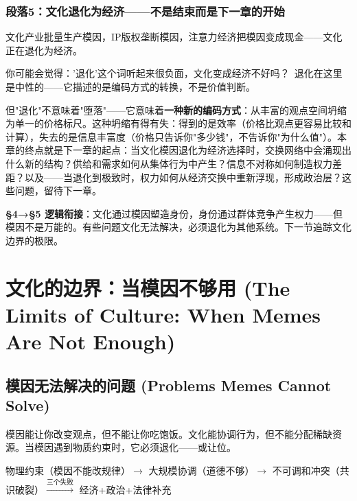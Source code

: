 \documentclass[../main.tex]{subfiles}
\begin{document}
	\subsubsection*{段落5：文化退化为经济——不是结束而是下一章的开始}

	文化产业批量生产模因，IP版权垄断模因，注意力经济把模因变成现金——文化正在退化为经济。

	\begin{tcolorbox}[colback=yellow!5, title=\textit{读者行为预测}]

		你可能会觉得：'退化'这个词听起来很负面，文化变成经济不好吗？\ 退化在这里是中性的——它描述的是编码方式的转换，不是价值判断。

	\end{tcolorbox}

但"退化"不意味着"堕落"——它意味着\textbf{一种新的编码方式}：从丰富的观点空间坍缩为单一的价格标尺。这种坍缩有得有失：得到的是效率（价格比观点更容易比较和计算），失去的是信息丰富度（价格只告诉你"多少钱"，不告诉你"为什么值"）。本章的终点就是下一章的起点：当文化模因退化为经济选择时，交换网络中会涌现出什么新的结构？供给和需求如何从集体行为中产生？信息不对称如何制造权力差距？以及——当退化到极致时，权力如何从经济交换中重新浮现，形成政治层？这些问题，留待下一章。

	\textbf{§4→§5 逻辑衔接}：文化通过模因塑造身份，身份通过群体竞争产生权力——但模因不是万能的。有些问题文化无法解决，必须退化为其他系统。下一节追踪文化边界的极限。

	\section{文化的边界：当模因不够用 (The Limits of Culture: When Memes Are Not Enough)}

	\subsection{模因无法解决的问题 (Problems Memes Cannot Solve)}

	\begin{motivation}

		模因能让你改变观点，但不能让你吃饱饭。文化能协调行为，但不能分配稀缺资源。当模因遇到物质约束时，它必须退化——或让位。

	\end{motivation}

	\begin{logicmap}

		物理约束（模因不能改规律）$\rightarrow$ 大规模协调（道德不够）$\rightarrow$ 不可调和冲突（共识破裂）$\xrightarrow{\text{三个失败}}$ 经济+政治+法律补充

	\end{logicmap}
\end{document}
